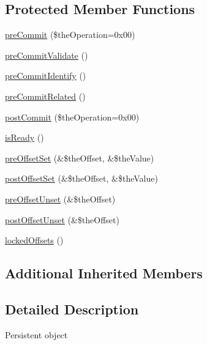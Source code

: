 \subsection*{Protected Member Functions}
\begin{DoxyCompactItemize}
\item 
\hyperlink{class_ontology_wrapper_1_1_persistent_object_ae621d7c6ec2b645d65ae86e6c183c7ef}{pre\-Commit} (\$the\-Operation=0x00)
\item 
\hyperlink{class_ontology_wrapper_1_1_persistent_object_a912920d6f5503319d971c6ec723d70fd}{pre\-Commit\-Validate} ()
\item 
\hyperlink{class_ontology_wrapper_1_1_persistent_object_ae6d939c963067e6553d31b02ee9c1e83}{pre\-Commit\-Identify} ()
\item 
\hyperlink{class_ontology_wrapper_1_1_persistent_object_a3eb6889a4ef15c0271561b45497b6a9d}{pre\-Commit\-Related} ()
\item 
\hyperlink{class_ontology_wrapper_1_1_persistent_object_a52d445c7c34fd2b28c48c4c47d02b1db}{post\-Commit} (\$the\-Operation=0x00)
\item 
\hyperlink{class_ontology_wrapper_1_1_persistent_object_abd1574b220543be97cb221fa2caded7a}{is\-Ready} ()
\item 
\hyperlink{class_ontology_wrapper_1_1_persistent_object_a20d852f3b8e527cab2e38f4ab54b6dad}{pre\-Offset\-Set} (\&\$the\-Offset, \&\$the\-Value)
\item 
\hyperlink{class_ontology_wrapper_1_1_persistent_object_af8ba5fa19459b094716006cad82bda7b}{post\-Offset\-Set} (\&\$the\-Offset, \&\$the\-Value)
\item 
\hyperlink{class_ontology_wrapper_1_1_persistent_object_a3a2f90f5bb97e7ebc1002f3ac77deab3}{pre\-Offset\-Unset} (\&\$the\-Offset)
\item 
\hyperlink{class_ontology_wrapper_1_1_persistent_object_abb77ffc2aa042528dc3129925f4b7764}{post\-Offset\-Unset} (\&\$the\-Offset)
\item 
\hyperlink{class_ontology_wrapper_1_1_persistent_object_ab539a5204bd58394d0a88353db957023}{locked\-Offsets} ()
\end{DoxyCompactItemize}
\subsection*{Additional Inherited Members}


\subsection{Detailed Description}
Persistent object

